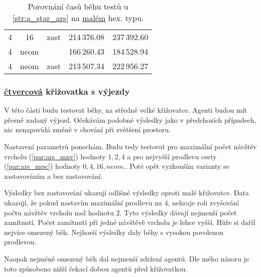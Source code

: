 \begin{table}[b!]
\begin{tabular}{c c c D{.}{,}{6.2}D{.}{,}{6.2}}
		4  & 16   & zast     & 214\,376.08                               & 237\,392.60                                \\
		4  & neom & \mc{---} & 166\,260.43                               & 184\,528.94                                \\
		4  & neom & zast     & 213\,507.34                               & 222\,956.27                                \\
	\end{tabular}
	\caption{Porovnání časů běhu testů u \ref{str:a_star_ars} na \hyperref[par:data_mala]{malém} hex. typu.}\label{tab:ars_exp_male_hexagonalni_casy}
\end{table}

\subsubsection{ \hyperref[subsec:ctvercovy_typ]{čtvercová} křižovatka s výjezdy}
\label{subsubsec:exp_ars_stredni_ctvercovakrizovatka}

V této části budu testovat běhy, na středně velké křižovatce.
Agenti budou mít přesně zadaný výjezd.
Očekávám podobné výsledky jako v předchozích případech, nic nenapovídá změně v chování při zvětšení prostoru.

Nastavení parametrů ponechám.
Budu tedy testovat pro maximální počet návštěv vrcholu (\ref{par:ars_mnv}) hodnoty $1, 2, 4$
a pro nejvyšší prodlevu cesty (\ref{par:ars_mpc}) hodnoty $0, 4, 16, neom.$.
Poté opět vyzkouším varianty se zastavováním a bez zastavování.

Výsledky bez zastavování ukazují odlišné výsledky oproti malé křižovatce.
Data ukazují, že pokud nastavím maximální prodlevu na $4$, nehraje roli zvyšování počtu návštěv vrcholu nad hodnotu $2$.
Tyto výsledky dávají nejmenší počet zamítnutí.
Počet zamítnutí při jedné návštěvě vrcholu je lehce vyšší.
Hůře si dařil nejvíce omezený běh.
Nejhorší výsledky daly běhy s vysokou povolenou prodlevou.

Naopak nejméně omezený běh dal nejmenší zdržení agentů.
Dle mého názoru je toto způsobeno nižší čekací dobou agentů před křižovatkou.

